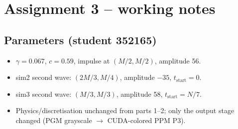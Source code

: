 \section{Assignment 3 -- working notes}

\subsection{Parameters (student 352165)}
\begin{itemize}
\item $\gamma=0.067$, $c=0.59$, impulse at $(M/2,M/2)$, amplitude 56.
\item sim2 second wave: $(2M/3,M/4)$, amplitude $-35$, $t_{\text{start}}=0$.
\item sim3 second wave: $(M/3,M/3)$, amplitude 58, $t_{\text{start}}=N/7$.
\item Physics/discretisation unchanged from parts 1--2; only the output stage changed (PGM grayscale $\to$ CUDA-colored PPM P3).
\end{itemize}

